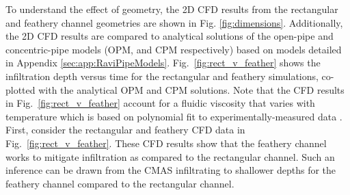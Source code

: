 \documentclass[%
 aip,
 amsmath,amssymb,
 reprint,%
]{revtex4-1}
\begin{document}
To understand the effect of geometry, the 2D CFD results from the rectangular and feathery channel geometries are shown in Fig. \ref{fig:dimensions}.
Additionally, the 2D CFD results are compared to analytical solutions of the open-pipe and concentric-pipe models (OPM, and CPM respectively) \cite{Naraparaju2019} based on models detailed in Appendix \ref{sec:app:RaviPipeModels}. 
Fig.~\ref{fig:rect_v_feather} shows the infiltration depth versus time for the rectangular and feathery simulations, co-plotted with the analytical OPM and CPM solutions. 
Note that the CFD results in Fig.~\ref{fig:rect_v_feather} account for a fluidic viscosity that varies with temperature which is based on polynomial fit to experimentally-measured data \cite{Naraparaju2017}.\\

First, consider the rectangular and feathery CFD data in Fig.~\ref{fig:rect_v_feather}.
These CFD results show that the feathery channel works to mitigate infiltration as compared to the rectangular channel. Such an inference can be drawn from the CMAS infiltrating to shallower depths for the feathery channel compared to the rectangular channel. 
\end{document}
